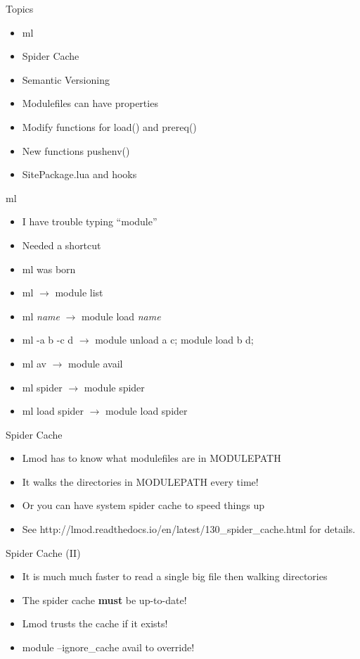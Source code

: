 \documentclass[dvipsnames,aspectratio=169]{beamer}
\begin{document}
\begin{frame}{Topics}
  \begin{itemize}
    \item ml 
    \item Spider Cache
    \item Semantic Versioning
    \item Modulefiles can have properties
    \item Modify functions for load() and prereq()
    \item New functions pushenv()
    \item SitePackage.lua and hooks
  \end{itemize}
\end{frame}

\begin{frame}{ml}
  \begin{itemize}
    \item I have trouble typing ``module''
    \item Needed a shortcut
    \item ml was born
    \item ml $\rightarrow$ module list
    \item ml \emph{name} $\rightarrow$ module load \emph{name}
    \item ml -a b -c d $\rightarrow$ module unload a c; module load b d; 
    \item ml av $\rightarrow$ module avail
    \item ml spider $\rightarrow$ module spider
    \item ml load spider $\rightarrow$ module load spider
  \end{itemize}
\end{frame}

\begin{frame}{Spider Cache}
  \begin{itemize}
    \item Lmod has to know what modulefiles are in MODULEPATH
    \item It walks the directories in MODULEPATH every time!
    \item Or you can have system spider cache to speed things up
    \item See
      http://lmod.readthedocs.io/en/latest/130\_spider\_cache.html for
      details.
  \end{itemize}
\end{frame}

\begin{frame}{Spider Cache (II)}
  \begin{itemize}
    \item It is much much faster to read a single big file then
      walking directories
    \item The spider cache \textbf{must} be up-to-date!
    \item Lmod trusts the cache if it exists!
    \item module --ignore\_cache avail to override!
  \end{itemize}
\end{frame}
\end{document}
